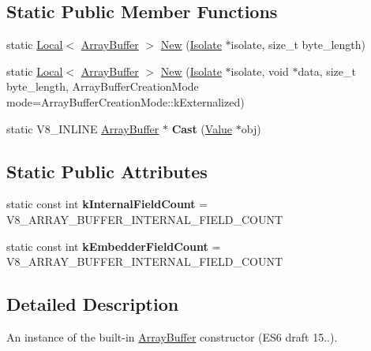 \subsection*{Static Public Member Functions}
\begin{DoxyCompactItemize}
\item 
static \mbox{\hyperlink{classv8_1_1Local}{Local}}$<$ \mbox{\hyperlink{classv8_1_1ArrayBuffer}{Array\+Buffer}} $>$ \mbox{\hyperlink{classv8_1_1ArrayBuffer_ad752e03d7cc7fe863656ad6183785ab7}{New}} (\mbox{\hyperlink{classv8_1_1Isolate}{Isolate}} $\ast$isolate, size\+\_\+t byte\+\_\+length)
\item 
static \mbox{\hyperlink{classv8_1_1Local}{Local}}$<$ \mbox{\hyperlink{classv8_1_1ArrayBuffer}{Array\+Buffer}} $>$ \mbox{\hyperlink{classv8_1_1ArrayBuffer_acc65e714766b0d0d791b0d43ec52d0bb}{New}} (\mbox{\hyperlink{classv8_1_1Isolate}{Isolate}} $\ast$isolate, void $\ast$data, size\+\_\+t byte\+\_\+length, Array\+Buffer\+Creation\+Mode mode=Array\+Buffer\+Creation\+Mode\+::k\+Externalized)
\item 
\mbox{\label{classv8_1_1ArrayBuffer_a4b0a703ae34217507a8ebc9cabf7336a}} 
static V8\+\_\+\+I\+N\+L\+I\+NE \mbox{\hyperlink{classv8_1_1ArrayBuffer}{Array\+Buffer}} $\ast$ {\bfseries Cast} (\mbox{\hyperlink{classv8_1_1Value}{Value}} $\ast$obj)
\end{DoxyCompactItemize}
\subsection*{Static Public Attributes}
\begin{DoxyCompactItemize}
\item 
\mbox{\label{classv8_1_1ArrayBuffer_af49000a2ea120e49da846ef02a42ac69}} 
static const int {\bfseries k\+Internal\+Field\+Count} = V8\+\_\+\+A\+R\+R\+A\+Y\+\_\+\+B\+U\+F\+F\+E\+R\+\_\+\+I\+N\+T\+E\+R\+N\+A\+L\+\_\+\+F\+I\+E\+L\+D\+\_\+\+C\+O\+U\+NT
\item 
\mbox{\label{classv8_1_1ArrayBuffer_ae383ba945bf84433c8cd3de5d3d56345}} 
static const int {\bfseries k\+Embedder\+Field\+Count} = V8\+\_\+\+A\+R\+R\+A\+Y\+\_\+\+B\+U\+F\+F\+E\+R\+\_\+\+I\+N\+T\+E\+R\+N\+A\+L\+\_\+\+F\+I\+E\+L\+D\+\_\+\+C\+O\+U\+NT
\end{DoxyCompactItemize}


\subsection{Detailed Description}
An instance of the built-\/in \mbox{\hyperlink{classv8_1_1ArrayBuffer}{Array\+Buffer}} constructor (E\+S6 draft 15..). 

